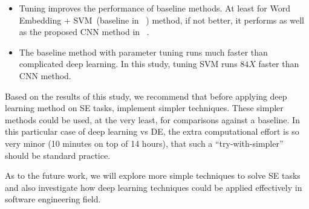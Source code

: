 \documentclass[sigconf,review, anonymous]{acmart}
\theoremstyle{break}
\newcommand{\bi}{\begin{itemize}[leftmargin=0.4cm]}
\newcommand{\ei}{\end{itemize}}
\begin{document}
\bi
\item Tuning improves the performance of baseline methods. 
At least for Word Embedding + SVM~(baseline in ~\cite{xu2016predicting}) method, if not better,
it performs as well as the proposed CNN method in ~\cite{xu2016predicting}.
\item The baseline method with parameter tuning runs much faster than complicated deep learning.
In this study, tuning SVM runs $84X$ faster than CNN method.
\ei



Based on the results of this study, we recommend that before applying 
deep learning method on SE tasks, implement
  simpler techniques.
  These simpler methods could be used,
  at the very least, for comparisons against a baseline.
  In this particular case of deep learning vs DE, the extra computational effort  is so very minor (10 minutes on top of 14 hours), 
  that such a ``try-with-simpler'' should
  be standard practice.
  

As to the future work, we will explore more simple techniques to solve SE tasks and also
investigate how deep learning techniques could be applied effectively in software engineering
field. 





\balance
 
\end{document}
